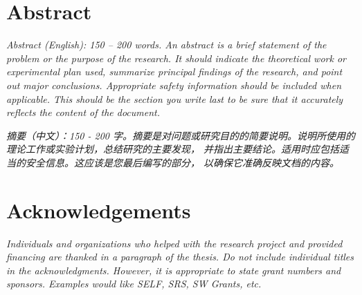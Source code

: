 \documentclass[11pt,a4paper,oneside]{report}
\newcommand{\instructions}[1]{{\color{orange}\itshape #1}}
\begin{document}

\clearpage
{}


\setcounter{tocdepth}{0} %
\tableofcontents


\chapter*{Abstract}


\instructions{Abstract (English): 150 -- 200 words. An abstract is a brief
statement of the problem or the purpose of the research. It should indicate
the theoretical work or experimental plan used, summarize principal findings
of the research, and point out major conclusions. Appropriate safety
information should be included when applicable. This should be the section
you write last to be sure that it accurately reflects the content of the 
document.}

\vspace{4\bigskipamount}


\instructions{摘要（中文）：150 - 200
字。摘要是对问题或研究目的的简要说明。说明所使用的理论工作或实验计划，总结研究的主要发现，
并指出主要结论。适用时应包括适当的安全信息。这应该是您最后编写的部分，
以确保它准确反映文档的内容。}



\chapter*{Acknowledgements}
\label{acknowledgements}

\instructions{Individuals and organizations who helped with the research project
and provided financing are thanked in a paragraph of the thesis. Do not
include individual titles in the acknowledgments. However, it is
appropriate to state grant numbers and sponsors. Examples would like
SELF, SRS, SW Grants, etc.}
\end{document}
